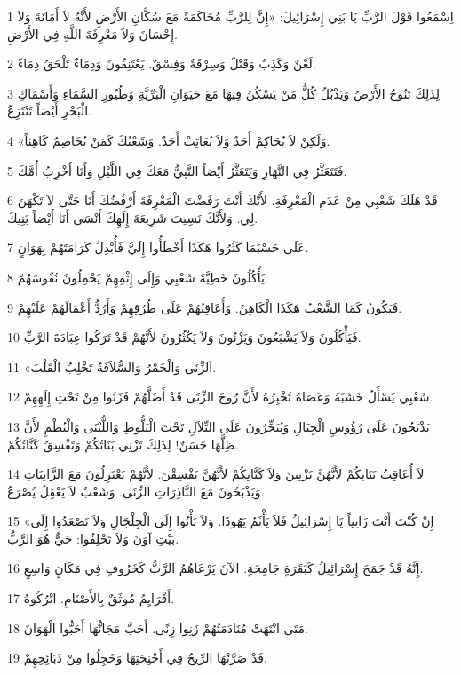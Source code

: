\par 1 اِسْمَعُوا قَوْلَ الرَّبِّ يَا بَنِي إِسْرَائِيلَ: «إِنَّ لِلرَّبِّ مُحَاكَمَةً مَعَ سُكَّانِ الأَرْضِ لأَنَّهُ لاَ أَمَانَةَ وَلاَ إِحْسَانَ وَلاَ مَعْرِفَةَ اللَّهِ فِي الأَرْضِ.
\par 2 لَعْنٌ وَكَذِبٌ وَقَتْلٌ وَسِرْقَةٌ وَفِسْقٌ. يَعْتَنِفُونَ وَدِمَاءٌ تَلْحَقُ دِمَاءً.
\par 3 لِذَلِكَ تَنُوحُ الأَرْضُ وَيَذْبُلُ كُلُّ مَنْ يَسْكُنُ فِيهَا مَعَ حَيَوَانِ الْبَرِّيَّةِ وَطُيُورِ السَّمَاءِ وَأَسْمَاكِ الْبَحْرِ أَيْضاً تَنْتَزِعُ.
\par 4 «وَلَكِنْ لاَ يُحَاكِمْ أَحَدٌ وَلاَ يُعَاتِبْ أَحَدٌ. وَشَعْبُكَ كَمَنْ يُخَاصِمُ كَاهِناً.
\par 5 فَتَتَعَثَّرُ فِي النَّهَارِ وَيَتَعَثَّرُ أَيْضاً النَّبِيُّ مَعَكَ فِي اللَّيْلِ وَأَنَا أَخْرِبُ أُمَّكَ.
\par 6 قَدْ هَلَكَ شَعْبِي مِنْ عَدَمِ الْمَعْرِفَةِ. لأَنَّكَ أَنْتَ رَفَضْتَ الْمَعْرِفَةَ أَرْفُضُكَ أَنَا حَتَّى لاَ تَكْهَنَ لِي. وَلأَنَّكَ نَسِيتَ شَرِيعَةَ إِلَهِكَ أَنْسَى أَنَا أَيْضاً بَنِيكَ.
\par 7 عَلَى حَسْبَمَا كَثُرُوا هَكَذَا أَخْطَأُوا إِلَيَّ فَأُبْدِلُ كَرَامَتَهُمْ بِهَوَانٍ.
\par 8 يَأْكُلُونَ خَطِيَّةَ شَعْبِي وَإِلَى إِثْمِهِمْ يَحْمِلُونَ نُفُوسَهُمْ.
\par 9 فَيَكُونُ كَمَا الشَّعْبُ هَكَذَا الْكَاهِنُ. وَأُعَاقِبُهُمْ عَلَى طُرُقِهِمْ وَأَرُدُّ أَعْمَالَهُمْ عَلَيْهِمْ.
\par 10 فَيَأْكُلُونَ وَلاَ يَشْبَعُونَ وَيَزْنُونَ وَلاَ يَكْثُرُونَ لأَنَّهُمْ قَدْ تَرَكُوا عِبَادَةَ الرَّبِّ.
\par 11 «اَلزِّنَى وَالْخَمْرُ وَالسُّلاَفَةُ تَخْلِبُ الْقَلْبَ.
\par 12 شَعْبِي يَسْأَلُ خَشَبَهُ وَعَصَاهُ تُخْبِرُهُ لأَنَّ رُوحَ الزِّنَى قَدْ أَضَلَّهُمْ فَزَنُوا مِنْ تَحْتِ إِلَهِهِمْ.
\par 13 يَذْبَحُونَ عَلَى رُؤُوسِ الْجِبَالِ وَيُبَخِّرُونَ عَلَى التِّلاَلِ تَحْتَ الْبَلُّوطِ وَاللُّبْنَى وَالْبُطْمِ لأَنَّ ظِلَّهَا حَسَنٌ! لِذَلِكَ تَزْنِي بَنَاتُكُمْ وَتَفْسِقُ كَنَّاتُكُمْ.
\par 14 لاَ أُعَاقِبُ بَنَاتِكُمْ لأَنَّهُنَّ يَزْنِينَ وَلاَ كَنَّاتِكُمْ لأَنَّهُنَّ يَفْسِقْنَ. لأَنَّهُمْ يَعْتَزِلُونَ مَعَ الزَّانِيَاتِ وَيَذْبَحُونَ مَعَ النَّاذِرَاتِ الزِّنَى. وَشَعْبٌ لاَ يَعْقِلُ يُصْرَعُ.
\par 15 «إِنْ كُنْتَ أَنْتَ زَانِياً يَا إِسْرَائِيلُ فَلاَ يَأْثَمُ يَهُوذَا. وَلاَ تَأْتُوا إِلَى الْجِلْجَالِ وَلاَ تَصْعَدُوا إِلَى بَيْتِ آوَنَ وَلاَ تَحْلِفُوا: حَيٌّ هُوَ الرَّبُّ.
\par 16 إِنَّهُ قَدْ جَمَحَ إِسْرَائِيلُ كَبَقَرَةٍ جَامِحَةٍ. الآنَ يَرْعَاهُمُ الرَّبُّ كَخَرُوفٍ فِي مَكَانٍ وَاسِعٍ.
\par 17 أَفْرَايِمُ مُوثَقٌ بِالأَصْنَامِ. اتْرُكُوهُ.
\par 18 مَتَى انْتَهَتْ مُنَادَمَتُهُمْ زَنِوا زِنًى. أَحَبَّ مَجَانُّهَا أَحَبُّوا الْهَوَانَ.
\par 19 قَدْ صَرَّتْهَا الرِّيحُ فِي أَجْنِحَتِهَا وَخَجِلُوا مِنْ ذَبَائِحِهِمْ.

